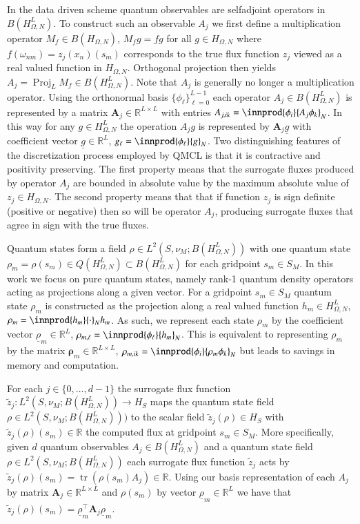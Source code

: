 \documentclass[letterpaper,10pt,3p,preprint]{elsarticle}
\newcommand{\Rbb}{\mathbb{R}}
\DeclareMathOperator{\tr}{tr}
\DeclareMathOperator{\Proj}{Proj}
\newcommand{\vect}[1]{\underline{#1}}
\newcommand{\matr}[1]{\bm{#1}}
\begin{document}
In the data driven scheme quantum observables are selfadjoint
operators in $B(H_{\Omega,N}^L)$.
To construct such an observable $A_j$ we first define
a multiplication operator
$M_f\in B(H_{\Omega,N})$, $M_fg=fg$
for all $g\in H_{\Omega,N}$
where $f(\omega_{nm})=z_j(x_n)(s_m)$
corresponds to the true flux function $z_j$
viewed as a real valued function in $H_{\Omega,N}$.
Orthogonal projection then yields
$A_j=\Proj_LM_f\in B(H_{\Omega,N}^L)$.
Note that $A_j$ is generally no longer a multiplication operator.
Using the orthonormal basis $\{\phi_\ell\}_{\ell=0}^{L-1}$
each operator $A_j\in B(H_{\Omega,N}^L)$
is represented by a matrix $\matr{A}_j\in\Rbb^{L\times L}$
with entries
$A_{j,ik}=\innprod{\phi_i}{A_j\phi_k}_N$.
In this way for any $g\in H_{\Omega,N}^L$ the operation
$A_jg$ is represented by $\matr{A}_j\vect{g}$
with coefficient vector $\vect{g}\in\Rbb^L$,
$g_\ell=\innprod{\phi_\ell}{g}_N$.
Two distinguishing features of the discretization process
employed by QMCL is that it is contractive and
positivity preserving.
The first property means that the surrogate fluxes produced
by operator $A_j$ are bounded in absolute value by the maximum
absolute value of
$z_j\in H_{\Omega,N}$.
The second property means that that if function $z_j$ is sign
definite (positive or negative) then so will be operator $A_j$,
producing surrogate fluxes that agree in sign with the true
fluxes.

Quantum states form a field
$\rho\in L^2(S,\nu_M;B(H_{\Omega,N}^L))$
with one quantum state
$\rho_m=\rho(s_m)\in Q(H_{\Omega,N}^L)\subset B(H_{\Omega,N}^L)$
for each gridpoint $s_m\in S_M$.
In this work we focus on pure quantum states,
namely rank-1 quantum density operators acting as
projections along a given vector.
For a gridpoint $s_m\in S_M$ quantum state $\rho_m$
is constructed as the projection along a real valued function
$h_m\in H_{\Omega,N}^L$,
$\rho_m=\innprod{h_m}{\cdot}_Nh_m$.
As such, we represent each state $\rho_m$
by the coefficient vector
$\vect{\rho}_m\in\Rbb^L$,
$\rho_{m,\ell}=\innprod{\phi_\ell}{h_m}_N$.
This is equivalent to representing $\rho_m$ by the matrix
$\matr{\rho}_m\in\Rbb^{L\times L}$,
$\rho_{m,ik}=\innprod{\phi_i}{\rho_m\phi_k}_N$
but leads to savings in memory and computation.

For each $j\in\{0,\ldots,d-1\}$
the surrogate flux function
$\tilde{z}_j\colon L^2(S,\nu_M;B(H_{\Omega,N}^L))\to H_S$
maps the quantum state field
$\rho\in L^2(S,\nu_M;B(H_{\Omega,N}^L)))$
to the scalar field
$\tilde{z}_j(\rho)\in H_S$
with $\tilde{z}_j(\rho)(s_m)\in\Rbb$
the computed flux at gridpoint $s_m\in S_M$.
More specifically, given $d$ quantum observables
$A_j\in B(H_{\Omega,N}^L)$
and a quantum state field
$\rho\in L^2(S,\nu_M; B(H_{\Omega,N}^L))$
each surrogate flux function $\tilde{z}_j$ acts by
$\tilde{z}_j(\rho)(s_m)=\tr(\rho(s_m)A_j)\in\Rbb$.
Using our basis representation of each $A_j$ by matrix
$\matr{A}_j\in\Rbb^{L\times L}$ and
$\rho(s_m)$ by vector $\vect{\rho}_m\in\Rbb^L$
we have that
$\tilde{z}_j(\rho)(s_m)
=\vect{\rho}_m^\top\matr{A}_j\vect{\rho}_m$.
\end{document}

